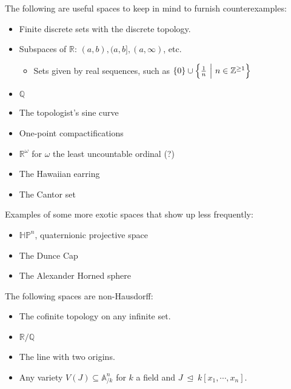 \begin{example}

The following are useful spaces to keep in mind to furnish
counterexamples:

\begin{itemize}
\tightlist
\item
  Finite discrete sets with the discrete topology.
\item
  Subspaces of \({\mathbb{R}}\): \((a, b), (a, b], (a, \infty)\), etc.

  \begin{itemize}
  \tightlist
  \item
    Sets given by real sequences, such as
    \(\left\{{0}\right\} \cup\left\{{{1 \over n}{~\mathrel{\Big|}~}n\in {\mathbb{Z}}^{\geq 1}}\right\}\)
  \end{itemize}
\item
  \({\mathbb{Q}}\)
\item
  The topologist's sine curve
\item
  One-point compactifications
\item
  \({\mathbb{R}}^\omega\) for \(\omega\) the least uncountable ordinal
  (?)
\item
  The Hawaiian earring
\item
  The Cantor set
\end{itemize}

Examples of some more exotic spaces that show up less frequently:

\begin{itemize}
\tightlist
\item
  \({\mathbb{HP}}^n\), quaternionic projective space
\item
  The Dunce Cap
\item
  The Alexander Horned sphere
\end{itemize}

\end{example}


\begin{example}

The following spaces are non-Hausdorff:

\begin{itemize}
\tightlist
\item
  The cofinite topology on any infinite set.
\item
  \({\mathbb{R}}/{\mathbb{Q}}\)
\item
  The line with two origins.
\item
  Any variety \(V(J) \subseteq {\mathbb{A}}^n_{/k}\) for \(k\) a field
  and \(J{~\trianglelefteq~}k[x_1, \cdots, x_{n}]\).
\end{itemize}

\end{example}

